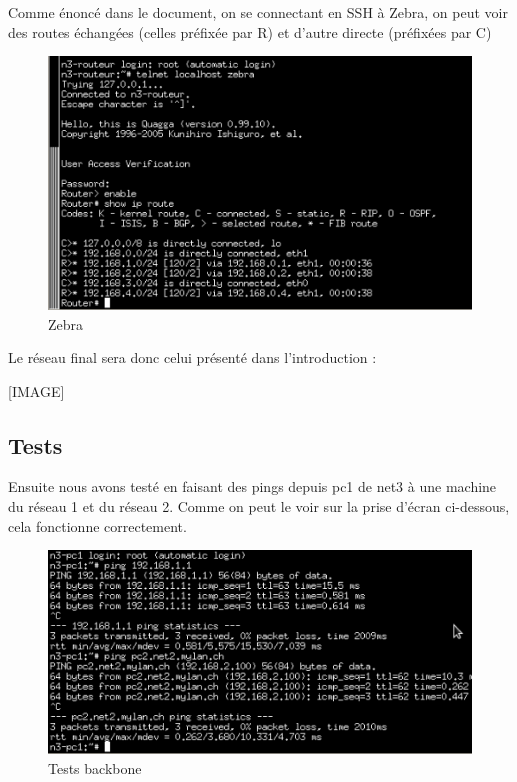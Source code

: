 \documentclass{article}
\begin{document}
Comme énoncé dans le document, on se connectant en SSH à Zebra, on peut voir des routes échangées (celles préfixée par R) et d'autre directe (préfixées par C)

\begin{figure}[!h]
	\centering
	\includegraphics{./captures/zebra-check.png}
	\caption{Zebra}
	\label{fig:Zebra}
\end{figure}

Le réseau final sera donc celui présenté dans l'introduction : 

[IMAGE]

\subsection{Tests}

Ensuite nous avons testé en faisant des pings depuis pc1 de net3 à une machine du réseau 1 et du réseau 2. Comme on peut le voir sur la prise d'écran ci-dessous, cela fonctionne correctement.

\begin{figure}[!h]
	\centering
	\includegraphics{./captures/test-zebra-from-pc.png}
	\caption{Tests backbone}
	\label{fig:Tests backbone}
\end{figure}
\end{document}
